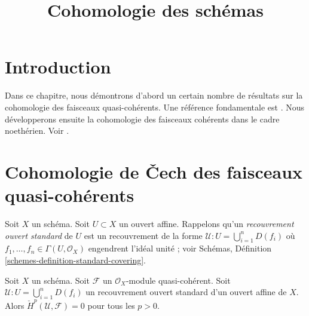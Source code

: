 

%


\title{Cohomologie des schémas}


\maketitle

\label{section-phantom}

\tableofcontents

\section{Introduction}
\label{section-introduction}

\noindent
Dans ce chapitre, nous démontrons d'abord un certain nombre de résultats sur la
cohomologie des faisceaux quasi-cohérents. Une référence fondamentale est
\cite{EGA}. Nous développerons ensuite la cohomologie des faisceaux cohérents
dans le cadre noethérien. Voir \cite{FAC}.







\section{Cohomologie de {\v C}ech des faisceaux quasi-cohérents}
\label{section-cech-quasi-coherent}

\noindent
Soit $X$ un schéma. Soit $U \subset X$ un ouvert affine. Rappelons qu'un {\it
recouvrement ouvert standard} de $U$ est un recouvrement de la forme
$\mathcal{U} : U = \bigcup_{i = 1}^n D(f_i)$ où $f_1, \ldots, f_n \in \Gamma(U, \mathcal{O}_X)$ engendrent l'idéal unité ; voir Schémas, Définition
\ref{schemes-definition-standard-covering}.

\begin{lemma}
\label{lemma-cech-cohomology-quasi-coherent-trivial}
Soit $X$ un schéma. Soit $\mathcal{F}$ un $\mathcal{O}_X$-module
quasi-cohérent. Soit $\mathcal{U} : U = \bigcup_{i = 1}^n D(f_i)$ un
recouvrement ouvert standard d'un ouvert affine de $X$. Alors
$\check{H}^p(\mathcal{U}, \mathcal{F}) = 0$ pour tous les $p > 0$.
\end{lemma}

